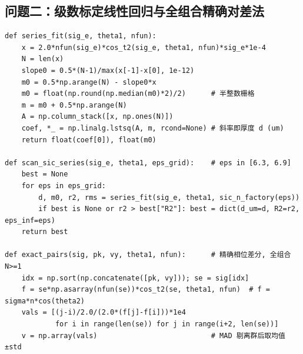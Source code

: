 \documentclass[11pt,a4paper,fontset=fandol]{ctexart}
\begin{document}
\subsection{问题二：级数标定线性回归与全组合精确对差法}
\begin{lstlisting}
def series_fit(sig_e, theta1, nfun):
    x = 2.0*nfun(sig_e)*cos_t2(sig_e, theta1, nfun)*sig_e*1e-4
    N = len(x)
    slope0 = 0.5*(N-1)/max(x[-1]-x[0], 1e-12)
    m0 = 0.5*np.arange(N) - slope0*x
    m0 = float(np.round(np.median(m0)*2)/2)      # 半整数栅格
    m = m0 + 0.5*np.arange(N)
    A = np.column_stack([x, np.ones(N)])
    coef, *_ = np.linalg.lstsq(A, m, rcond=None) # 斜率即厚度 d (um)
    return float(coef[0]), float(m0)

def scan_sic_series(sig_e, theta1, eps_grid):    # eps in [6.3, 6.9]
    best = None
    for eps in eps_grid:
        d, m0, r2, rms = series_fit(sig_e, theta1, sic_n_factory(eps))
        if best is None or r2 > best["R2"]: best = dict(d_um=d, R2=r2, eps_inf=eps)
    return best

def exact_pairs(sig, pk, vy, theta1, nfun):      # 精确相位差分, 全组合 N>=1
    idx = np.sort(np.concatenate([pk, vy])); se = sig[idx]
    f = se*np.asarray(nfun(se))*cos_t2(se, theta1, nfun)  # f = sigma*n*cos(theta2)
    vals = [(j-i)/2.0/(2.0*(f[j]-f[i]))*1e4
            for i in range(len(se)) for j in range(i+2, len(se))]
    v = np.array(vals)                           # MAD 剔离群后取均值±std
\end{lstlisting}

\end{document}
